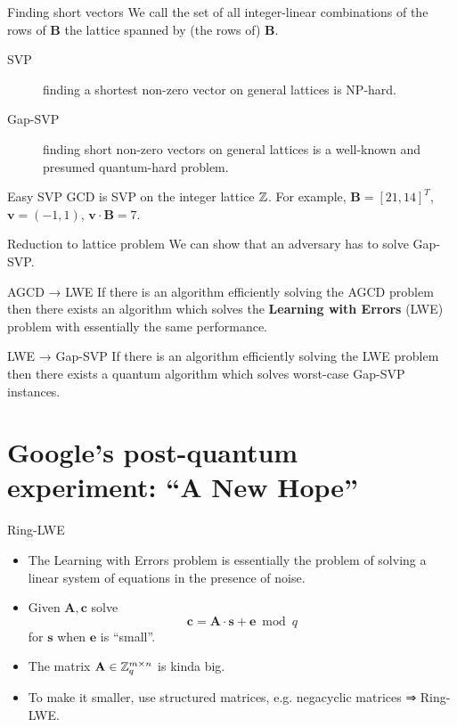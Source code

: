 \documentclass[presentation,smaller]{beamer}
\newcommand{\ZZ}[1][blank]{\ensuremath{\ifthenelse{\equal{#1}{blank}}{\mathbb{Z}}{\mathbb{Z}\left[#1\right]}\xspace}}
\renewcommand{\vec}[1]{\ensuremath{\mathbf{#1}}\xspace}
\begin{document}
\begin{frame}[label={sec:orgheadline32}]{Finding short vectors}
We call the set of all integer-linear combinations of the rows of \(\vec{B}\) the \alert{lattice} spanned by (the rows of) \(\vec{B}\).

\begin{description}
\item[{SVP}] finding a \alert{shortest} non-zero vector on \alert{general} lattices is NP-hard.

\item[{Gap-SVP}] finding \alert{short} non-zero vectors on \alert{general} lattices is a well-known and presumed quantum-hard problem.
\end{description}

\begin{block}{Easy SVP}
GCD is SVP on the integer lattice \(\ZZ\). For example, \(\vec{B} = {[21, 14]}^T\), \(\vec{v} = (-1,1)\), \(\vec{v} ⋅\vec{B} = 7\).
\end{block}
\end{frame}

\begin{frame}[label={sec:orgheadline33}]{Reduction to lattice problem}
We can show that an adversary \alert{has} to solve Gap-SVP.

\begin{block}{AGCD → LWE}
If there is an algorithm efficiently solving the AGCD problem then there exists an algorithm which solves the \textbf{Learning with Errors} (LWE) problem with essentially the same performance.  
\end{block}

\begin{block}{LWE → Gap-SVP}
If there is an algorithm efficiently solving the LWE problem then there exists a quantum algorithm which solves worst-case Gap-SVP instances.
\end{block}
\end{frame}

\section{Google’s post-quantum experiment: “A New Hope”}
\label{sec:orgheadline38}

\begin{frame}[label={sec:orgheadline35}]{Ring-LWE}
\begin{itemize}
\item The Learning with Errors problem is essentially the problem of solving a linear system of equations in the presence of noise.
\item Given \(\vec{A}, \vec{c}\) solve \[\vec{c} = \vec{A} ⋅ \vec{s} + \vec{e} \bmod q\] for \(\vec{s}\) when \(\vec{e}\) is “small”.
\item The matrix \(\vec{A} \in \ZZ_q^{m \times n}\) is kinda big.
\item To make it smaller, use \alert{structured matrices}, e.g. negacyclic matrices ⇒ Ring-LWE.
\end{itemize}
\end{frame}
\end{document}
